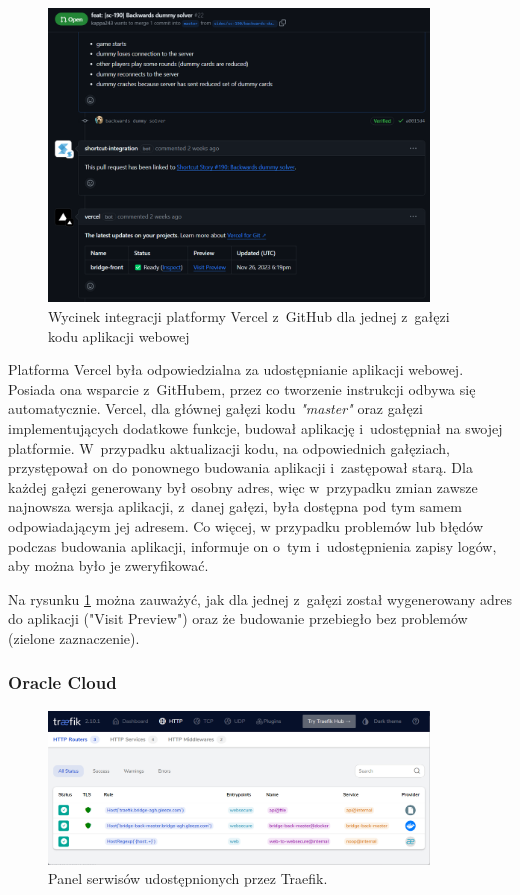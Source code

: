 \begin{figure}[!]
  \centering
  \includegraphics[width=0.9\textwidth]{img/github/github-vercel.png}
  \caption{Wycinek integracji platformy Vercel z~GitHub dla jednej z~gałęzi kodu aplikacji webowej}
  \label{fig:github-vercel}
\end{figure}

Platforma Vercel\cite{Vercel} była odpowiedzialna za
udostępnianie aplikacji webowej. Posiada ona wsparcie \mbox{z~GitHubem},
przez co tworzenie instrukcji odbywa się automatycznie.
Vercel, dla głównej gałęzi kodu \textit{"master"} oraz
gałęzi implementujących dodatkowe funkcje, budował aplikację
i~udostępniał na swojej platformie. W~przypadku aktualizacji
kodu, na odpowiednich gałęziach, przystępował on do ponownego
budowania aplikacji i~zastępował starą. Dla każdej gałęzi
generowany był osobny adres, więc w~przypadku zmian zawsze
najnowsza wersja aplikacji, z~danej gałęzi, była dostępna pod
tym samem odpowiadającym jej adresem. Co więcej, w przypadku
problemów lub błędów podczas budowania aplikacji, informuje
on o~tym i~udostępnienia zapisy logów, aby można było je
zweryfikować.

Na rysunku
\ref{fig:github-vercel} można zauważyć, jak dla jednej
z~gałęzi został wygenerowany adres do aplikacji
("Visit Preview") oraz że budowanie przebiegło bez problemów
(zielone zaznaczenie).

\FloatBarrier


\subsubsection{Oracle Cloud}

\begin{figure}[!]
  \centering
  \includegraphics[width=0.9\textwidth]{img/traefik/dashboard.png}
  \caption{Panel serwisów udostępnionych przez Traefik.}
  \label{fig:traefik-dashboard}
\end{figure}

